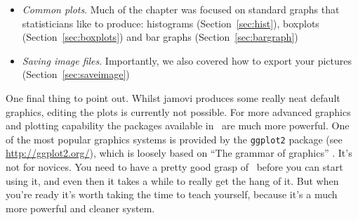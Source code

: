 \begin{itemize}
\item {\it Common plots}. Much of the chapter was focused on standard graphs that statisticians like to produce: histograms (Section~\ref{sec:hist}), boxplots (Section~\ref{sec:boxplots}) and bar graphs (Section~\ref{sec:bargraph}) 
\item {\it Saving image files}. Importantly, we also covered how to export your pictures (Section~\ref{sec:saveimage})
\end{itemize} 

One final thing to point out. Whilst jamovi produces some really neat default graphics, editing the plots is currently not possible. For more advanced graphics and plotting capability the packages available in \R\ are much more powerful. One of the most popular graphics systems is provided by the \texttt{ggplot2} package (see \url{http://ggplot2.org/}), which is loosely based on ``The grammar of graphics'' \parencite{Wilkinson2006}. It's not for novices. You need to have a pretty good grasp of \R\ before you can start using it, and even then it takes a while to really get the hang of it. But when you're ready it's worth taking the time to teach yourself, because it's a much more powerful and cleaner system.





